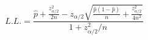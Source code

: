 

\[
L. L. = \frac{\hat{p} + \frac{z_{\alpha/2}^{2}}{2n} - z_{\alpha/2}\sqrt{\frac{\hat{p}(1-\hat{p})}{n} + \frac{z_{\alpha/2}^{2}}{4n^2}}} {1 + z_{\alpha/2}^{2}/n}
\]


